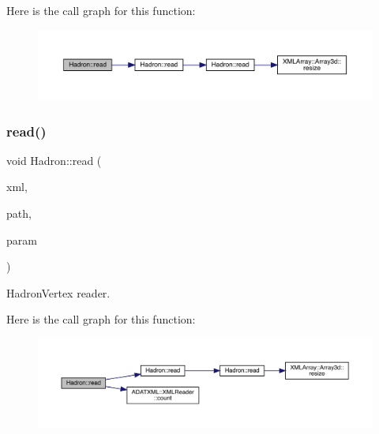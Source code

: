 Here is the call graph for this function\+:
\nopagebreak
\begin{figure}[H]
\begin{center}
\leavevmode
\includegraphics[width=350pt]{d1/daf/namespaceHadron_a9a69bb90cd1c62da66808573864f7cd1_cgraph}
\end{center}
\end{figure}
\mbox{\label{namespaceHadron_a83c06845cd19520623de3b0074b9d25c}} 
\subsubsection{\texorpdfstring{read()}{read()}\hspace{0.1cm}{\footnotesize\ttfamily [40/94]}}
{\footnotesize\ttfamily void Hadron\+::read (\begin{DoxyParamCaption}\item[{\mbox{\hyperlink{classADATXML_1_1XMLReader}{X\+M\+L\+Reader}} \&}]{xml,  }\item[{const std\+::string \&}]{path,  }\item[{\mbox{\hyperlink{structHadron_1_1HadronVertex__t}{Hadron\+Vertex\+\_\+t}} \&}]{param }\end{DoxyParamCaption})}



Hadron\+Vertex reader. 

Here is the call graph for this function\+:
\nopagebreak
\begin{figure}[H]
\begin{center}
\leavevmode
\includegraphics[width=350pt]{d1/daf/namespaceHadron_a83c06845cd19520623de3b0074b9d25c_cgraph}
\end{center}
\end{figure}
\mbox{\label{namespaceHadron_a10d99bb52996f8aec8a87612e98d5684}} 
